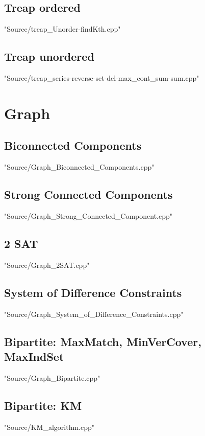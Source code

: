 \documentclass [12pt,twocolumn,oneside]{article}
\begin{document}
\subsection{Treap ordered}
 {"Source/treap_Unorder-findKth.cpp"}

\subsection{Treap unordered}
 {"Source/treap_series-reverse-set-del-max_cont_sum-sum.cpp"}




\newpage
\section{Graph}
\subsection{Biconnected Components}
 {"Source/Graph_Biconnected_Components.cpp"}

\subsection{Strong Connected Components}
 {"Source/Graph_Strong_Connected_Component.cpp"}

\subsection{2 SAT}
 {"Source/Graph_2SAT.cpp"}

\subsection{System of Difference Constraints}
 {"Source/Graph_System_of_Difference_Constraints.cpp"}

\subsection{Bipartite: MaxMatch, MinVerCover, MaxIndSet}
 {"Source/Graph_Bipartite.cpp"}

\subsection{Bipartite: KM}
 {"Source/KM_algorithm.cpp"}
\end{document}
